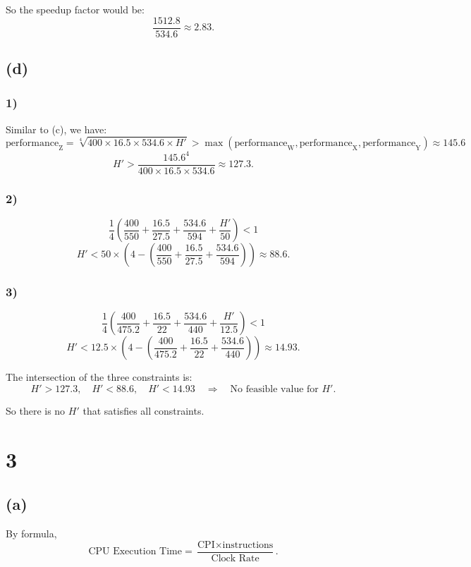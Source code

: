 \documentclass[12pt]{article}
\begin{document}
So the speedup factor would be:
$$
\frac{1512.8}{534.6} \approx 2.83.
$$

\subsection*{(d)}

\subsubsection*{1)}

Similar to (c), we have:
$$
\text{performance}_{\text{Z}} = \sqrt[4]{400 \times 16.5 \times 534.6 \times H'} > \max(\text{performance}_{\text{W}}, \text{performance}_{\text{X}}, \text{performance}_{\text{Y}}) \approx 145.6
$$
$$
H' > \frac{145.6^4}{400 \times 16.5 \times 534.6} \approx 127.3.
$$

\subsubsection*{2)}
$$
\frac{1}{4}\left(\frac{400}{550} + \frac{16.5}{27.5} + \frac{534.6}{594} + \frac{H'}{50}\right) < 1
$$
$$
H' < 50 \times \left(4 - \left(\frac{400}{550} + \frac{16.5}{27.5} + \frac{534.6}{594}\right)\right) \approx 88.6.
$$

\subsubsection*{3)}
$$
\frac{1}{4}\left(\frac{400}{475.2} + \frac{16.5}{22} + \frac{534.6}{440} + \frac{H'}{12.5}\right) < 1
$$
$$
H' < 12.5 \times \left(4 - \left(\frac{400}{475.2} + \frac{16.5}{22} + \frac{534.6}{440}\right)\right) \approx 14.93.
$$

The intersection of the three constraints is:
$$
H' > 127.3, \quad H' < 88.6, \quad H' < 14.93 \quad\Longrightarrow\quad \text{No feasible value for } H'.
$$

So there is no $H'$ that satisfies all constraints.

\section*{3}

\subsection*{(a)}
By formula,
$$
\text{CPU Execution Time} = \frac{\text{CPI} \times \text{instructions}}{\text{Clock Rate}}.
$$
\end{document}
